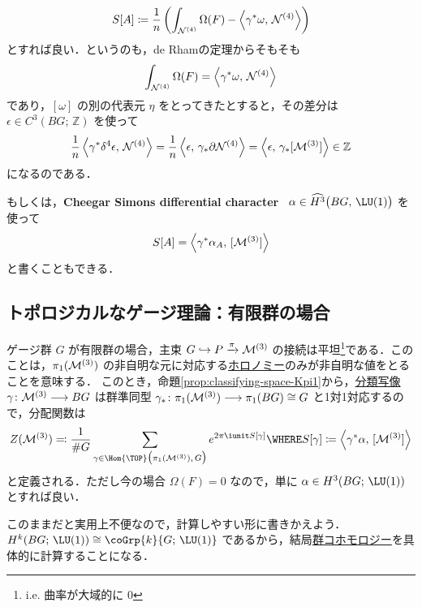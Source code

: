 \documentclass[TQFT_main]{subfiles}
\begin{document}
\begin{align}
    S[A] \coloneqq \frac{1}{n} \left(\int_{\mathcal{N}^{(4)}} \Omega(F) - \expval{\gamma^* \omega,\, \mathcal{N}^{(4)}} \right)
\end{align}
とすれば良い．というのも，de Rhamの定理からそもそも
\begin{align}
    \int_{\mathcal{N}^{(4)}} \Omega(F) = \expval{\gamma^* \omega,\, \mathcal{N}^{(4)}}
\end{align}
であり，$[\omega]$ の別の代表元 $\eta$ をとってきたとすると，その差分は $\epsilon \in C^3(BG;\, \mathbb{Z})$ を使って
\begin{align}
    \frac{1}{n} \expval{\gamma^* \delta^4 \epsilon,\, \mathcal{N}^{(4)}} = \frac{1}{n} \expval{\epsilon,\, \gamma_* \partial \mathcal{N}^{(4)}} = \expval{\epsilon,\, \gamma_* [\mathcal{M}^{(3)}]} \in \mathbb{Z}
\end{align}
になるのである．

もしくは，\textbf{Cheegar Simons differential character}~\cite{Simons_2007} $\alpha \in \widehat{H^3} \bigl(BG,\, \LU(1)\bigr)$ を使って
\begin{align}
    S[A] = \expval{\gamma^* \alpha_A,\, [\mathcal{M}^{(3)}]}
\end{align}
と書くこともできる．

\subsection{トポロジカルなゲージ理論：有限群の場合}

ゲージ群 $G$ が有限群の場合，主束 $G \hookrightarrow P \xrightarrow{\pi} \mathcal{M}^{(3)}$ の接続は平坦\footnote{i.e. 曲率が大域的に $0$}である．このことは，$\pi_1(\mathcal{M}^{(3)})$ の非自明な元に対応する\hyperref[def:holonomy]{ホロノミー}のみが非自明な値をとることを意味する．
このとき，命題\ref{prop:classifying-space-Kpi1}から，\hyperref[prop:universal-basic]{分類写像} $\gamma \colon \mathcal{M}^{(3)} \longrightarrow BG$ は群準同型 $\gamma_* \colon \pi_1(\mathcal{M}^{(3)}) \longrightarrow \pi_1(BG) \cong G$ と1対1対応するので，分配関数は
\begin{align}
    \label{eq:DW-partition-func}
    Z(\mfdcal{M}{3}) \eqqcolon \frac{1}{\# G} \sum_{\gamma \in \Hom{\TOP} \bigl( \pi_1(\mfdcal{M}{3}),\, G \bigr) } e^{2\pi \iunit S[\gamma]} \WHERE S[\gamma] \coloneqq \expval{\gamma^* \alpha,\, [\mfdcal{M}{3}]}
\end{align}
と定義される．ただし今の場合 $\Omega(F) = 0$ なので，単に $\alpha \in H^3(BG;\, \LU (1))$ とすれば良い．

このままだと実用上不便なので，計算しやすい形に書きかえよう．$H^k(BG;\, \LU (1)) \cong \coGrp{k}{G;\, \LU(1)}$ であるから，結局\hyperref[def:group-cohomology]{群コホモロジー}を具体的に計算することになる．
\end{document}
